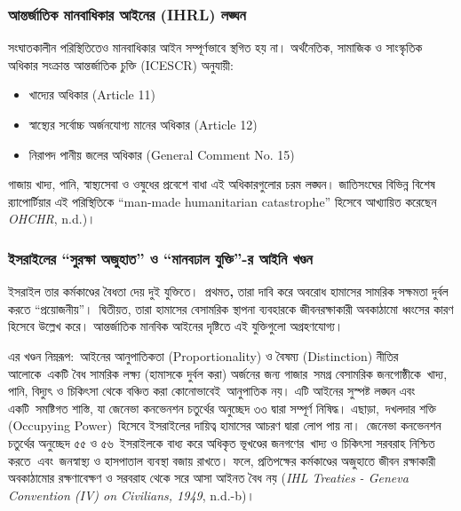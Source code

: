 \subsubsection{আন্তর্জাতিক মানবাধিকার আইনের (IHRL)
লঙ্ঘন}\label{ux986ux9a8ux9a4ux9b0ux99cux9a4ux995-ux9aeux9a8ux9acux9a7ux995ux9b0-ux986ux987ux9a8ux9b0-ihrl-ux9b2ux999ux998ux9a8}

সংঘাতকালীন পরিস্থিতিতেও মানবাধিকার আইন সম্পূর্ণভাবে স্থগিত হয় না। অর্থনৈতিক,
সামাজিক ও সাংস্কৃতিক অধিকার সংক্রান্ত আন্তর্জাতিক চুক্তি (ICESCR) অনুযায়ী:

\begin{itemize}
\item
  খাদ্যের অধিকার (Article 11)
\item
  স্বাস্থ্যের সর্বোচ্চ অর্জনযোগ্য মানের অধিকার (Article 12)
\item
  নিরাপদ পানীয় জলের অধিকার (General Comment No. 15)
\end{itemize}

গাজায় খাদ্য, পানি, স্বাস্থ্যসেবা ও ওষুধের প্রবেশে বাধা এই অধিকারগুলোর চরম লঙ্ঘন।
জাতিসংঘের বিভিন্ন বিশেষ র‌্যাপোর্টিয়ার এই পরিস্থিতিকে ``man-made humanitarian
catastrophe'' হিসেবে আখ্যায়িত করেছেন \emph{OHCHR}, n.d.)।

\subsubsection{\texorpdfstring{ ইসরাইলের ``সুরক্ষা অজুহাত'' ও
``মানবঢাল যুক্তি''-র আইনি খণ্ডন
}{ ইসরাইলের ``সুরক্ষা অজুহাত'' ও ``মানবঢাল যুক্তি''-র আইনি খণ্ডন }}\label{ux987ux9b8ux9b0ux987ux9b2ux9b0-ux9b8ux9b0ux995ux9b7-ux985ux99cux9b9ux9a4-ux993-ux9aeux9a8ux9acux9a2ux9b2-ux9afux995ux9a4-ux9b0-ux986ux987ux9a8-ux996ux9a3ux9a1ux9a8}

ইসরাইল তার কর্মকাণ্ডের বৈধতা দেয় দুই যুক্তিতে।~প্রথমত\textbf{,} তারা দাবি করে
অবরোধ হামাসের সামরিক সক্ষমতা দুর্বল করতে ``প্রয়োজনীয়''।~দ্বিতীয়ত, তারা
হামাসের বেসামরিক স্থাপনা ব্যবহারকে জীবনরক্ষাকারী অবকাঠামো ধ্বংসের কারণ
হিসেবে উল্লেখ করে। আন্তর্জাতিক মানবিক আইনের দৃষ্টিতে এই যুক্তিগুলো অগ্রহণযোগ্য।

এর খণ্ডন নিম্নরূপ:~আইনের আনুপাতিকতা (Proportionality) ও বৈষম্য (Distinction)
নীতির আলোকে~একটি বৈধ সামরিক লক্ষ্য (হামাসকে দুর্বল করা) অর্জনের জন্য
গাজার~সমগ্র বেসামরিক জনগোষ্ঠীকে~খাদ্য, পানি, বিদ্যুৎ ও চিকিৎসা থেকে বঞ্চিত করা
কোনোভাবেই~আনুপাতিক নয়। এটি আইনের সুস্পষ্ট লঙ্ঘন এবং একটি~সমষ্টিগত শাস্তি, যা
জেনেভা কনভেনশন চতুর্থের অনুচ্ছেদ ৩৩ দ্বারা সম্পূর্ণ নিষিদ্ধ। এছাড়া,~দখলদার শক্তি
(Occupying Power)~হিসেবে ইসরাইলের দায়িত্ব হামাসের আচরণ দ্বারা লোপ পায়
না।~জেনেভা কনভেনশন চতুর্থের অনুচ্ছেদ ৫৫ ও ৫৬~ইসরাইলকে বাধ্য করে অধিকৃত ভূখণ্ডের
জনগণের~খাদ্য ও চিকিৎসা সরবরাহ নিশ্চিত করতে\textbf{~}এবং~জনস্বাস্থ্য ও
হাসপাতাল ব্যবস্থা বজায় রাখতে। ফলে, প্রতিপক্ষের কর্মকাণ্ডের অজুহাতে জীবন
রক্ষাকারী অবকাঠামোর রক্ষণাবেক্ষণ ও সরবরাহ থেকে সরে আসা আইনত বৈধ নয়
(\emph{IHL Treaties - Geneva Convention (IV) on Civilians, 1949},
n.d.-b)।

